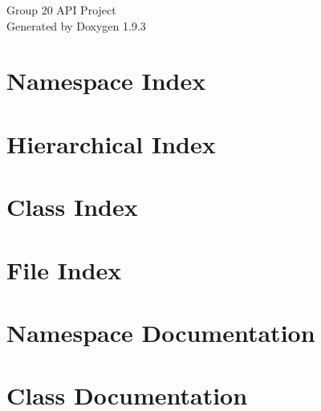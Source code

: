 \documentclass[twoside]{book}
\newcommand{\+}{\discretionary{\mbox{\scriptsize$\hookleftarrow$}}{}{}}
\newcommand{\clearemptydoublepage}{%
    \newpage{\pagestyle{empty}\cleardoublepage}%
  }
\begin{document}
  \raggedbottom
    \hypersetup{pageanchor=false,
                bookmarksnumbered=true,
                pdfencoding=unicode
               }
  \begin{titlepage}
  \vspace*{7cm}
  \begin{center}%
  {\Large Group 20 API Project}\\
  \vspace*{1cm}
  {\large Generated by Doxygen 1.9.3}\\
  \end{center}
  \end{titlepage}
  \clearemptydoublepage
  \tableofcontents
  \clearemptydoublepage
  \hypersetup{pageanchor=true}
\chapter{Namespace Index}

\chapter{Hierarchical Index}

\chapter{Class Index}

\chapter{File Index}

\chapter{Namespace Documentation}

\chapter{Class Documentation}















\end{document}
